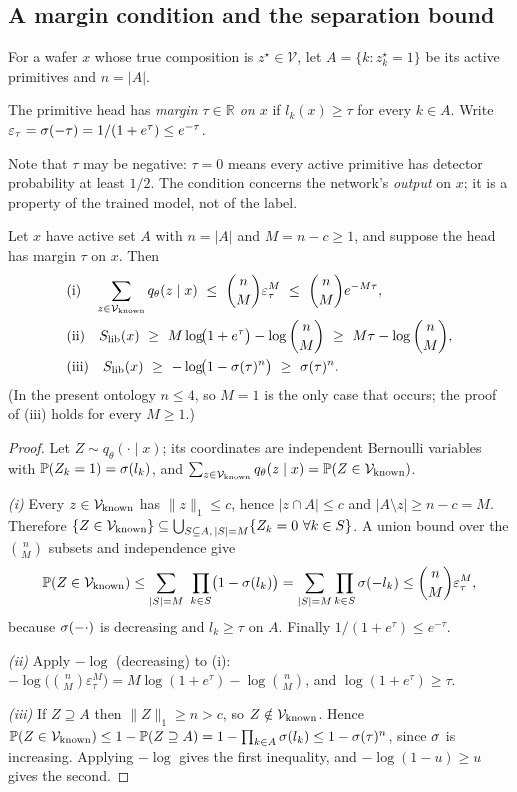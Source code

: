 \subsection{A margin condition and the separation bound}
For a wafer $x$ whose true composition is $z^\star\in\mathcal{V}$, let
$A=\{k: z^\star_k=1\}$ be its active primitives and $n=|A|$.

\begin{definition}\label{def:margin}
The primitive head has \emph{margin $\tau\in\mathbb{R}$ on $x$} if $l_k(x)\ge\tau$ for every
$k\in A$. Write $\varepsilon_\tau=\sigma(-\tau)=1/(1+e^{\tau})\le e^{-\tau}$.
\end{definition}
Note that $\tau$ may be negative: $\tau=0$ means every active primitive has detector probability
at least $1/2$. The condition concerns the network's \emph{output} on $x$; it is a property of the
trained model, not of the label.

\begin{theorem}\label{thm:sep}
Let $x$ have active set $A$ with $n=|A|$ and $M=n-c\ge1$, and suppose the head has margin $\tau$
on $x$. Then
\begin{align}
&\text{(i)}\quad \sum_{z\in\Vk}q_\theta(z\mid x)\ \le\ \binom{n}{M}\varepsilon_\tau^{M}\ \le\ \binom{n}{M}e^{-M\tau},\label{eq:i}\\
&\text{(ii)}\quad \Slib(x)\ \ge\ M\log\!\bigl(1+e^{\tau}\bigr)-\log\binom{n}{M}\ \ge\ M\tau-\log\binom{n}{M},\label{eq:ii}\\
&\text{(iii)}\quad \Slib(x)\ \ge\ -\log\!\bigl(1-\sigmoid(\tau)^{n}\bigr)\ \ge\ \sigmoid(\tau)^{n}.\label{eq:iii}
\end{align}
(In the present ontology $n\le4$, so $M=1$ is the only case that occurs; the proof of (iii)
holds for every $M\ge1$.)
\end{theorem}

\begin{proof}
Let $Z\sim q_\theta(\cdot\mid x)$; its coordinates are independent Bernoulli variables with
$\mathbb{P}(Z_k=1)=\sigma(l_k)$, and $\sum_{z\in\mathcal{V}_{\mathrm{known}}}q_\theta(z\mid x)=\mathbb{P}(Z\in\mathcal{V}_{\mathrm{known}})$.

\emph{(i)} Every $z\in\mathcal{V}_{\mathrm{known}}$ has $\|z\|_1\le c$, hence $|z\cap A|\le c$ and $|A\setminus z|\ge n-c=M$.
Therefore $\{Z\in\mathcal{V}_{\mathrm{known}}\}\subseteq\bigcup_{S\subseteq A,\,|S|=M}\{Z_k=0\ \forall k\in S\}$. A union bound over the
$\binom nM$ subsets and independence give
\[
\mathbb{P}(Z\in\mathcal{V}_{\mathrm{known}})\le\sum_{|S|=M}\ \prod_{k\in S}\bigl(1-\sigma(l_k)\bigr)=\sum_{|S|=M}\prod_{k\in S}\sigma(-l_k)
\le\binom nM\varepsilon_\tau^{M},
\]
because $\sigma(-\cdot)$ is decreasing and $l_k\ge\tau$ on $A$. Finally $1/(1+e^\tau)\le e^{-\tau}$.

\emph{(ii)} Apply $-\log$ (decreasing) to (i): $-\log\bigl(\binom nM\varepsilon_\tau^M\bigr)=M\log(1+e^\tau)-\log\binom nM$,
and $\log(1+e^\tau)\ge\tau$.

\emph{(iii)} If $Z\supseteq A$ then $\|Z\|_1\ge n>c$, so $Z\notin\mathcal{V}_{\mathrm{known}}$. Hence
$\mathbb{P}(Z\in\mathcal{V}_{\mathrm{known}})\le1-\mathbb{P}(Z\supseteq A)=1-\prod_{k\in A}\sigma(l_k)\le1-\sigma(\tau)^n$,
since $\sigma$ is increasing. Applying $-\log$ gives the first inequality, and $-\log(1-u)\ge u$
gives the second.
\end{proof}

